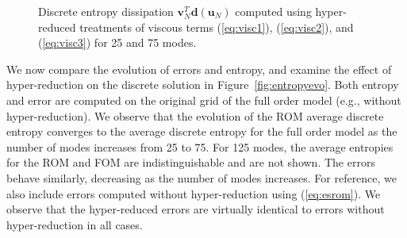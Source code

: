 \documentclass[preprint,10pt]{elsarticle}
\theoremstyle{definition}
\theoremstyle{lemma}
\theoremstyle{theorem}
\theoremstyle{assumption}
\begin{document}
\begin{figure}[!h]
\centering
{}
\hspace{.5em}
\caption{Discrete entropy dissipation $\bm{v}_N^T\bm{d}(\bm{u}_N)$ computed using hyper-reduced treatments of viscous terms (\ref{eq:visc1}), (\ref{eq:visc2}), and (\ref{eq:visc3}) for 25 and 75 modes.}
\label{fig:entropydiss}
\end{figure}

We now compare the evolution of errors and entropy, and examine the effect of hyper-reduction on the discrete solution in Figure~\ref{fig:entropyevo}.  Both entropy and error are computed on the original grid of the full order model (e.g., without hyper-reduction).  We observe that the evolution of the ROM average discrete entropy converges to the average discrete entropy for the full order model as the number of modes increases from 25 to 75.  For 125 modes, the average entropies for the ROM and FOM are indistinguishable and are not shown.  The errors behave similarly, decreasing as the number of modes increases.  For reference, we also include errors computed without hyper-reduction using (\ref{eq:esrom}).  We observe that the hyper-reduced errors are virtually identical to errors without hyper-reduction in all cases.
\end{document}
